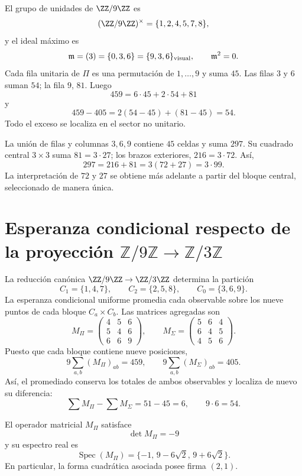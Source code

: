 El grupo de unidades de \(\ZZ/9\ZZ\) es
\[
(\ZZ/9\ZZ)^\times=\{1,2,4,5,7,8\},
\]
y el ideal máximo es
\[
\mathfrak m=(3)=\{0,3,6\}=\{9,3,6\}_{\rm visual},
\qquad\mathfrak m^2=0.
\]
Cada fila unitaria de \(\Pi\) es una permutación de \(1,\ldots,9\) y suma
\(45\). Las filas \(3\) y \(6\) suman \(54\); la fila \(9\), \(81\).
Luego
\[
459=6\cdot45+2\cdot54+81
\]
y
\[
459-405=2(54-45)+(81-45)=54.
\]
Todo el exceso se localiza en el sector no unitario.

La unión de filas y columnas \(3,6,9\) contiene \(45\) celdas y suma
\(297\). Su cuadrado central \(3\times3\) suma \(81=3\cdot27\); los brazos
exteriores, \(216=3\cdot72\). Así,
\[
297=216+81=3(72+27)=3\cdot99.
\]
La interpretación de \(72\) y \(27\) se obtiene más adelante a partir del
bloque central, seleccionado de manera única.

\section{Esperanza condicional respecto de la proyección \(\mathbb Z/9\mathbb Z\to\mathbb Z/3\mathbb Z\)}

La reducción canónica
\(\ZZ/9\ZZ\to\ZZ/3\ZZ\) determina la partición
\[
 C_1=\{1,4,7\},\qquad
 C_2=\{2,5,8\},\qquad
 C_0=\{3,6,9\}.
\]
La esperanza condicional uniforme promedia cada observable sobre los nueve puntos de cada bloque
\(C_a\times C_b\). Las matrices agregadas son
\[
 M_{\Pi}=
 \begin{pmatrix}4&5&6\\5&4&6\\6&6&9\end{pmatrix},
 \qquad
 M_{\Sigma}=
 \begin{pmatrix}5&6&4\\6&4&5\\4&5&6\end{pmatrix}.
\]
Puesto que cada bloque contiene nueve posiciones,
\[
 9\sum_{a,b}(M_\Pi)_{ab}=459,\qquad
 9\sum_{a,b}(M_\Sigma)_{ab}=405.
\]
Así, el promediado conserva los totales de ambos observables y localiza de
nuevo su diferencia:
\[
 \sum M_\Pi-\sum M_\Sigma=51-45=6,\qquad 9\cdot6=54.
\]

\begin{theorem}
\label{thm:app-espectro-agregado}
El operador matricial \(M_\Pi\) satisface
\[
 \det M_\Pi=-9
\]
y su espectro real es
\[
 \operatorname{Spec}(M_\Pi)
 =\{-1,\,9-6\sqrt2,\,9+6\sqrt2\}.
\]
En particular, la forma cuadrática asociada posee firma \((2,1)\).
\end{theorem}

